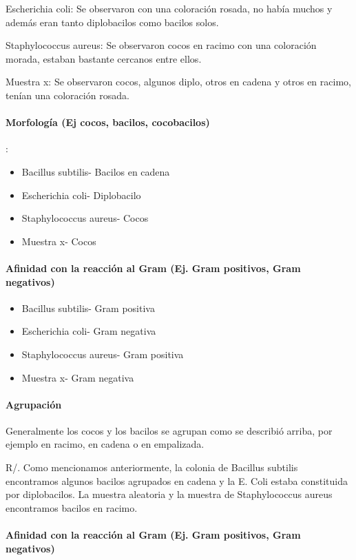 \documentclass[journal,transmag]{IEEEtran}
\begin{document}
Escherichia coli: Se observaron con una coloración rosada, no había muchos y además eran tanto diplobacilos como bacilos solos.

Staphylococcus aureus: Se observaron cocos en racimo con una coloración morada, estaban bastante cercanos entre ellos.

Muestra x: Se observaron cocos, algunos diplo, otros en cadena y otros en racimo, tenían una coloración rosada. 

\paragraph{\textbf{Morfología (Ej cocos, bacilos, cocobacilos)}}:

 \begin{itemize}
 \item Bacillus subtilis- Bacilos en cadena
\item Escherichia coli- Diplobacilo
\item Staphylococcus aureus- Cocos
\item Muestra x- Cocos
\end {itemize}
\paragraph{\textbf{Afinidad con la reacción al Gram (Ej. Gram positivos, Gram negativos) }}

 \begin{itemize}
 \item  Bacillus subtilis- Gram positiva
\item Escherichia coli-  Gram negativa
\item Staphylococcus aureus- Gram positiva
\item Muestra x- Gram negativa
\end {itemize}
\paragraph{\textbf{Agrupación}} Generalmente los cocos y los bacilos se agrupan como se describió arriba, por ejemplo en racimo, en cadena o en empalizada. 

R/. Como mencionamos anteriormente, la colonia de Bacillus subtilis encontramos algunos bacilos agrupados en cadena y la E. Coli estaba constituida por diplobacilos. La muestra aleatoria y la muestra de Staphylococcus aureus encontramos bacilos en racimo. 

\paragraph{\textbf{Afinidad con la reacción al Gram (Ej. Gram positivos, Gram negativos)} }
\end{document}
